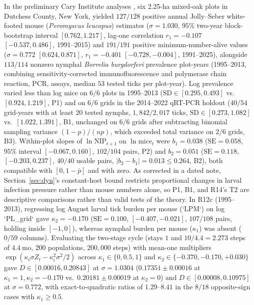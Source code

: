 In the preliminary Cary Institute analyses \citep{ostfeld20182019,ostfeld2026b,ladeau2025}, six 2.25-ha mixed-oak plots in Dutchess County, New York, yielded $127/128$ positive annual Jolly--Seber white-footed mouse (\textit{Peromyscus leucopus}) estimates ($\sigma = 1.030$, $95\%$ two-year block-bootstrap interval $[0.762, 1.217]$, lag-one correlation $r_1 = -0.107$ $[-0.537, 0.486]$, 1991--2015) and $191/191$ positive minimum-number-alive values ($\sigma = 0.772$ $[0.624, 0.871]$, $r_1 = -0.401$ $[-0.728, -0.004]$, 1991--2025), alongside $113/114$ nonzero nymphal \textit{Borrelia burgdorferi} prevalence plot-years (1995--2013, combining sensitivity-corrected immunofluorescence and polymerase chain reaction, PCR, assays, median $53$ tested ticks per plot-year). Log prevalence varied less than log mice on $6/6$ plots in 1995--2013 ($\mathrm{SD} \in [0.295, 0.493]$ vs.\ $[0.924, 1.219]$, P1) and on $6/6$ grids in the 2014--2022 qRT-PCR holdout ($40/54$ grid-years with at least $20$ tested nymphs, $1{,}842/2{,}017$ ticks, $\mathrm{SD} \in [0.273, 1.082]$ vs.\ $[1.022, 1.391]$, B1, unchanged on $6/6$ grids after subtracting binomial sampling variance $(1-p)/(np)$, which exceeded total variance on $2/6$ grids, B3). Within-plot slopes of $\ln\mathrm{NIP}_{t+1}$ on $\ln\text{mice}_t$ were $b_1 = 0.038$ ($\mathrm{SE} = 0.058$, $95\%$ interval $[-0.067, 0.160]$, $102/104$ pairs, P2) and $b_2 = 0.051$ ($\mathrm{SE} = 0.118$, $[-0.203, 0.237]$, $40/40$ usable pairs, $|b_2 - b_1| = 0.013 \le 0.264$, B2), both compatible with $[0, 1 - \bar{p}]$ and with zero. As corrected in a dated note, Section~\ref{sec:dyn}'s constant-host bound restricts proportional changes in larval infection pressure rather than mouse numbers alone, so P1, B1, and R14's T2 are descriptive comparisons rather than valid tests of the theory. In R12c (1995--2013), regressing log August larval tick burden per mouse (`LPM`) on log `PL\_grid` gave $\kappa_2 = -0.170$ ($\mathrm{SE} = 0.100$, $[-0.407, -0.021]$, $107/108$ pairs, holding inside $[-1, 0]$), whereas nymphal burden per mouse ($\kappa_1$) was absent ($0/59$ columns). Evaluating the two-stage cycle (stays $1$ and $10/4.4 = 2.273$ steps of $4.4\ \mathrm{mo}$, $200$ populations, $200{,}000$ steps) with mean-one multipliers $\exp(\kappa_i \sigma Z_t - \kappa_i^2 \sigma^2/2)$ across $\kappa_1 \in \{0, 0.5, 1\}$ and $\kappa_2 \in \{-0.370, -0.170, +0.030\}$ gave $D \in [0.00016, 0.20843]$ at $\sigma = 1.0304$ ($0.17351 \pm 0.00016$ at $\kappa_1 = 1, \kappa_2 = -0.170$ vs.\ $0.20181 \pm 0.00019$ at $\kappa_2 = 0$) and $D \in [0.00008, 0.10975]$ at $\sigma = 0.772$, with exact-to-quadratic ratios of $1.29$--$8.41$ in the $8/18$ opposite-sign cases with $\kappa_1 \ge 0.5$.

